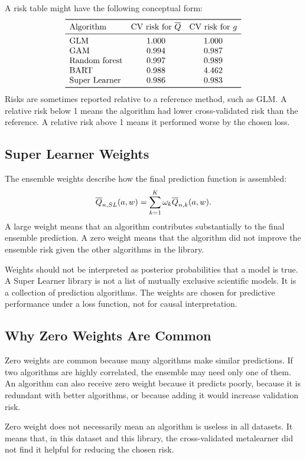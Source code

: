 A risk table might have the following conceptual form:
\[
\begin{array}{lcc}
\toprule
\text{Algorithm} & \text{CV risk for }\Qbar & \text{CV risk for }g\\
\midrule
\text{GLM} & 1.000 & 1.000\\
\text{GAM} & 0.994 & 0.987\\
\text{Random forest} & 0.997 & 0.989\\
\text{BART} & 0.988 & 4.462\\
\text{Super Learner} & 0.986 & 0.983\\
\bottomrule
\end{array}
\]
Risks are sometimes reported relative to a reference method, such as GLM. A relative
risk below 1 means the algorithm had lower cross-validated risk than the reference.
A relative risk above 1 means it performed worse by the chosen loss.

\subsection{Super Learner Weights}

The ensemble weights describe how the final prediction function is assembled:
\[
\overline{Q}_{n,SL}(a,w)=\sum_{k=1}^K\omega_k\overline{Q}_{n,k}(a,w).
\]
A large weight means that an algorithm contributes substantially to the final ensemble
prediction. A zero weight means that the algorithm did not improve the ensemble risk
given the other algorithms in the library.

Weights should not be interpreted as posterior probabilities that a model is true. A
Super Learner library is not a list of mutually exclusive scientific models. It is a
collection of prediction algorithms. The weights are chosen for predictive performance
under a loss function, not for causal interpretation.

\subsection{Why Zero Weights Are Common}

Zero weights are common because many algorithms make similar predictions. If two
algorithms are highly correlated, the ensemble may need only one of them. An
algorithm can also receive zero weight because it predicts poorly, because it is
redundant with better algorithms, or because adding it would increase validation risk.

Zero weight does not necessarily mean an algorithm is useless in all datasets. It means
that, in this dataset and this library, the cross-validated metalearner did not find it
helpful for reducing the chosen risk.

